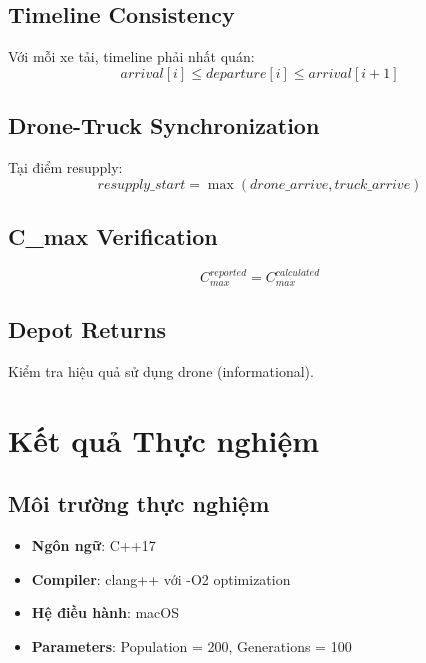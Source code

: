 \documentclass[12pt,a4paper]{article}
\begin{document}
\subsection{Timeline Consistency}
Với mỗi xe tải, timeline phải nhất quán:
\begin{equation}
    arrival[i] \leq departure[i] \leq arrival[i+1]
\end{equation}

\subsection{Drone-Truck Synchronization}
Tại điểm resupply:
\begin{equation}
    resupply\_start = \max(drone\_arrive, truck\_arrive)
\end{equation}

\subsection{C\_max Verification}
\begin{equation}
    C_{max}^{reported} = C_{max}^{calculated}
\end{equation}

\subsection{Depot Returns}
Kiểm tra hiệu quả sử dụng drone (informational).

\section{Kết quả Thực nghiệm}

\subsection{Môi trường thực nghiệm}

\begin{itemize}
    \item \textbf{Ngôn ngữ}: C++17
    \item \textbf{Compiler}: clang++ với -O2 optimization
    \item \textbf{Hệ điều hành}: macOS
    \item \textbf{Parameters}: Population = 200, Generations = 100
\end{itemize}
\end{document}
